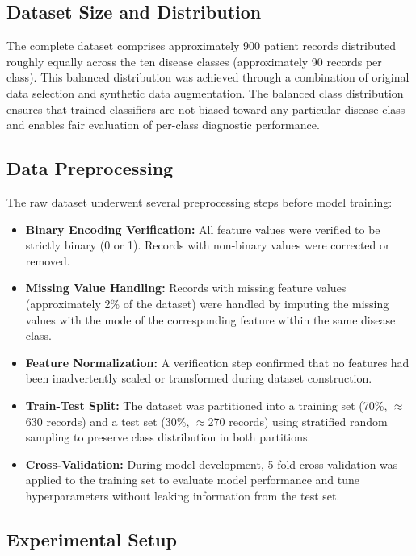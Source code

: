 \documentclass[12pt,a4paper]{article}
\begin{document}
\subsection{Dataset Size and Distribution}

The complete dataset comprises approximately 900 patient records distributed roughly equally across the ten disease classes (approximately 90 records per class). This balanced distribution was achieved through a combination of original data selection and synthetic data augmentation. The balanced class distribution ensures that trained classifiers are not biased toward any particular disease class and enables fair evaluation of per-class diagnostic performance.

\subsection{Data Preprocessing}

The raw dataset underwent several preprocessing steps before model training:

\begin{itemize}[leftmargin=1.5cm]
    \item \textbf{Binary Encoding Verification:} All feature values were verified to be strictly binary (0 or 1). Records with non-binary values were corrected or removed.
    \item \textbf{Missing Value Handling:} Records with missing feature values (approximately 2\% of the dataset) were handled by imputing the missing values with the mode of the corresponding feature within the same disease class.
    \item \textbf{Feature Normalization:} A verification step confirmed that no features had been inadvertently scaled or transformed during dataset construction.
    \item \textbf{Train-Test Split:} The dataset was partitioned into a training set (70\%, $\approx$630 records) and a test set (30\%, $\approx$270 records) using stratified random sampling to preserve class distribution in both partitions.
    \item \textbf{Cross-Validation:} During model development, 5-fold cross-validation was applied to the training set to evaluate model performance and tune hyperparameters without leaking information from the test set.
\end{itemize}

\subsection{Experimental Setup}
\end{document}
